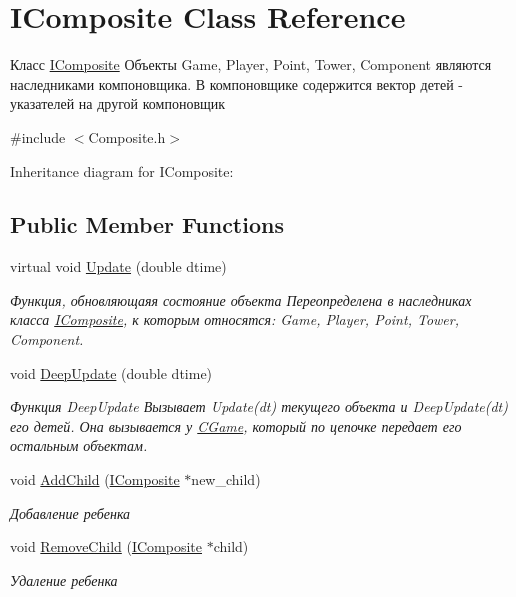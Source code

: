 \hypertarget{classIComposite}{}\section{I\+Composite Class Reference}
\label{classIComposite}


Класс \hyperlink{classIComposite}{I\+Composite} Объекты Game, Player, Point, Tower, Component являются наследниками компоновщика. В компоновщике содержится вектор детей -\/ указателей на другой компоновщик  




{\ttfamily \#include $<$Composite.\+h$>$}



Inheritance diagram for I\+Composite\+:
\subsection*{Public Member Functions}
\begin{DoxyCompactItemize}
\item 
virtual void \hyperlink{classIComposite_a75a8ab8f27a49b87e0c61e735fa00afd}{Update} (double dtime)
\begin{DoxyCompactList}\small\item\em Функция, обновляющаяя состояние объекта Переопределена в наследниках класса \hyperlink{classIComposite}{I\+Composite}, к которым относятся\+: Game, Player, Point, Tower, Component. \end{DoxyCompactList}\item 
void \hyperlink{classIComposite_abf3420f55bcc97e0c97ecc7128b56661}{Deep\+Update} (double dtime)
\begin{DoxyCompactList}\small\item\em Функция Deep\+Update Вызывает Update(dt) текущего объекта и Deep\+Update(dt) его детей. Она вызывается у \hyperlink{classCGame}{C\+Game}, который по цепочке передает его остальным объектам. \end{DoxyCompactList}\item 
void \hyperlink{classIComposite_a889fcd5161b20592299d25d4e00727b0}{Add\+Child} (\hyperlink{classIComposite}{I\+Composite} $\ast$new\+\_\+child)
\begin{DoxyCompactList}\small\item\em Добавление ребенка \end{DoxyCompactList}\item 
void \hyperlink{classIComposite_a26de042dafea60095d61a1779807a7c7}{Remove\+Child} (\hyperlink{classIComposite}{I\+Composite} $\ast$child)
\begin{DoxyCompactList}\small\item\em Удаление ребенка \end{DoxyCompactList}\end{DoxyCompactItemize}


